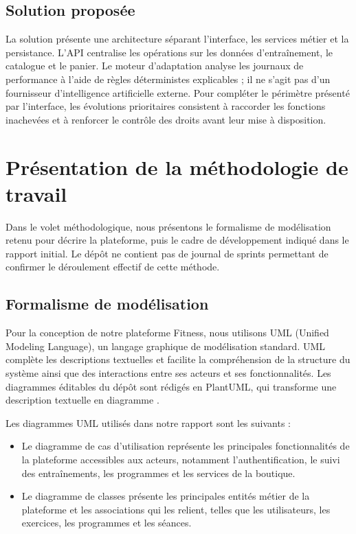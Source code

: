 ﻿\documentclass[12pt,a4paper]{report}
\begin{document}
\subsection{Solution proposée}
\label{c1-s2-sub5}
La solution présente une architecture séparant l'interface, les services métier et la persistance. L'API centralise les opérations sur les données d'entraînement, le catalogue et le panier. Le moteur d'adaptation analyse les journaux de performance à l'aide de règles déterministes explicables ; il ne s'agit pas d'un fournisseur d'intelligence artificielle externe. Pour compléter le périmètre présenté par l'interface, les évolutions prioritaires consistent à raccorder les fonctions inachevées et à renforcer le contrôle des droits avant leur mise à disposition.

\section{Présentation de la méthodologie de travail}
\label{c1-s3}
Dans le volet méthodologique, nous présentons le formalisme de modélisation retenu pour décrire la plateforme, puis le cadre de développement indiqué dans le rapport initial. Le dépôt ne contient pas de journal de sprints permettant de confirmer le déroulement effectif de cette méthode.

\subsection{Formalisme de modélisation}
\label{c1-s3-sub1}
    Pour la conception de notre plateforme Fitness, nous utilisons UML (Unified Modeling Language), un langage graphique de modélisation standard. UML complète les descriptions textuelles et facilite la compréhension de la structure du système ainsi que des interactions entre ses acteurs et ses fonctionnalités. Les diagrammes éditables du dépôt sont rédigés en PlantUML, qui transforme une description textuelle en diagramme \cite{plantuml}.

Les diagrammes UML utilisés dans notre rapport sont les suivants :
\begin{itemize}[leftmargin=*]
  \item Le diagramme de cas d'utilisation représente les principales fonctionnalités de la plateforme accessibles aux acteurs, notamment l'authentification, le suivi des entraînements, les programmes et les services de la boutique.
  \item Le diagramme de classes présente les principales entités métier de la plateforme et les associations qui les relient, telles que les utilisateurs, les exercices, les programmes et les séances.
\end{itemize}
\end{document}
